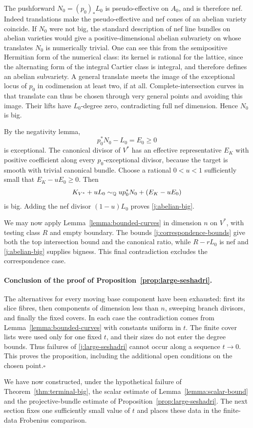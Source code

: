 The pushforward $N_0=(p_0)_*L_0$ is pseudo-effective on $A_0$,
and is therefore nef. Indeed translations make the
pseudo-effective and nef cones of an abelian variety coincide.
If $N_0$ were not big, the standard description of nef line
bundles on abelian varieties would give a positive-dimensional
abelian subvariety on whose translates $N_0$ is numerically
trivial. One can see this from the semipositive Hermitian form of
the numerical class: its kernel is rational for the lattice,
since the alternating form of the integral Cartier class is
integral, and therefore defines an abelian subvariety.
A general translate meets the image of the exceptional locus of
$p_0$ in codimension at least two, if at all. Complete-intersection
curves in that translate can thus be chosen through very general
points and avoiding this image. Their lifts have $L_0$-degree
zero, contradicting full nef dimension. Hence $N_0$ is big.

By the negativity lemma,
\[
                         p_0^*N_0-L_0=E_0\ge0
\]
is exceptional. The canonical divisor of $V^*$ has an effective
representative $E_K$ with positive coefficient along every
$p_0$-exceptional divisor, because the target is smooth with
trivial canonical bundle. Choose a rational $0<u<1$ sufficiently
small that $E_K-uE_0\ge0$. Then
\[
 K_{V^*}+uL_0\sim_\mathbb Q u p_0^*N_0+(E_K-uE_0)
\]
is big. Adding the nef divisor $(1-u)L_0$ proves
\eqref{j:abelian-big}.

We may now apply Lemma~\ref{lemma:bounded-curves} in dimension
$n$ on $V^*$, with testing class $R$ and empty boundary.
The bounds \eqref{j:correspondence-bounds} give both the top
intersection bound and the canonical ratio, while $R-rL_0$ is
nef and \eqref{j:abelian-big} supplies bigness. This final
contradiction excludes the correspondence case.

\paragraph{Conclusion of the proof of
Proposition~\ref{prop:large-seshadri}.}
The alternatives for every moving base component have been
exhausted: first its slice fibres, then components of dimension
less than $n$, sweeping branch divisors, and finally the fixed
covers. In each case the contradiction comes from
Lemma~\ref{lemma:bounded-curves} with constants uniform in $t$.
The finite cover lists were used only for one fixed $t$, and their
sizes do not enter the degree bounds. Thus failures of
\eqref{j:large-seshadri} cannot occur along a sequence $t\to0$.
This proves the proposition, including the additional open
conditions on the chosen point.\hfill$\square$

We have now constructed, under the hypothetical failure of
Theorem~\ref{thm:terminal-big}, the scalar estimate of
Lemma~\ref{lemma:scalar-bound} and the projective-bundle estimate
of Proposition~\ref{prop:large-seshadri}. The next section fixes
one sufficiently small value of $t$ and places these data in the
finite-data Frobenius comparison.
